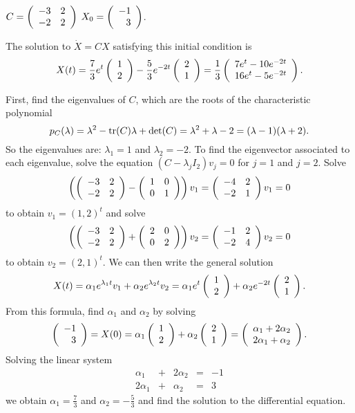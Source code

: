 \documentclass{ximera}
\begin{document}
\begin{exercise}  \label{c4.10A.1c}
$C = \left(\begin{array}{rr} -3 & 2\\ -2 &2\end{array}\right)$ \AND $X_0 = \left(\begin{array}{r} -1 \\ 3\end{array}\right)$.

\begin{solution}
\ans The solution to $\dot{X} = CX$ satisfying this
initial condition is
\[
X(t) = \frac{7}{3}e^t\left(\begin{array}{r} 1 \\ 2\end{array}\right) - \frac{5}{3}e^{-2t}\left(\begin{array}{r} 2 \\ 1\end{array}\right)
= \frac{1}{3}\left(\begin{array}{c} 7e^t - 10e^{-2t} \\ 16e^t - 5e^{-2t}\end{array}\right).
\]

\soln First, find the eigenvalues of $C$, which are the roots of the
characteristic polynomial
\[
p_C(\lambda) = \lambda^2 - {\rm tr}(C)\lambda + \det(C) =
\lambda^2 + \lambda - 2 = (\lambda - 1)(\lambda + 2).
\]
So the eigenvalues are: $\lambda_1 = 1$ and $\lambda_2 = -2$.
To find the eigenvector associated to each eigenvalue, solve
the equation $(C - \lambda_jI_2)v_j = 0$ for $j = 1$ and $j = 2$.  Solve
\[
\left(\left(\begin{array}{rr} -3 & 2\\ -2 &2\end{array}\right) - \left(\begin{array}{rr} 1 & 0\\ 0 &1\end{array}\right)\right)v_1 =
\left(\begin{array}{rr} -4 & 2\\ -2 &1\end{array}\right)v_1 = 0
\]
to obtain $v_1 = (1,2)^t$ and solve
\[
\left(\left(\begin{array}{rr} -3 & 2\\ -2 &2\end{array}\right) + \left(\begin{array}{rr} 2 & 0\\ 0 &2\end{array}\right)\right)v_2 =
\left(\begin{array}{rr} -1 & 2\\ -2 &4\end{array}\right)v_2 = 0
\]
to obtain $v_2 = (2,1)^t$.  We can then write the general solution
\[
X(t) = \alpha_1e^{\lambda_1 t}v_1 + \alpha_2e^{\lambda_2 t}v_2
= \alpha_1e^t\left(\begin{array}{r} 1 \\ 2\end{array}\right) + \alpha_2e^{-2t}\left(\begin{array}{r} 2 \\ 1\end{array}\right).
\]
From this formula, find $\alpha_1$ and $\alpha_2$ by solving
\[
\left(\begin{array}{r} -1 \\ 3\end{array}\right) = X(0) = \alpha_1\left(\begin{array}{r} 1 \\ 2\end{array}\right) + \alpha_2\left(\begin{array}{r} 2 \\ 1\end{array}\right) =
\left(\begin{array}{c} \alpha_1 + 2\alpha_2 \\ 2\alpha_1 + \alpha_2\end{array}\right).
\]
Solving the linear system
\[
\begin{array}{rrrrr}
\alpha_1 & + & 2\alpha_2 & = & -1 \\
2\alpha_1 & + & \alpha_2 & = & 3
\end{array}
\]
we obtain $\alpha_1 = \frac{7}{3}$ and $\alpha_2 = -\frac{5}{3}$
and find the solution to the differential equation.


\end{solution}
\end{exercise}
\end{document}
